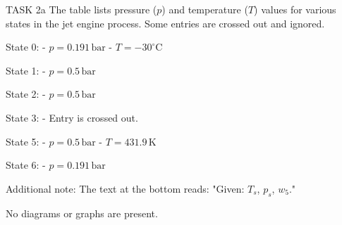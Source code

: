 TASK 2a  
The table lists pressure (\( p \)) and temperature (\( T \)) values for various states in the jet engine process. Some entries are crossed out and ignored.  

State 0:  
- \( p = 0.191 \, \text{bar} \)  
- \( T = -30^\circ\text{C} \)  

State 1:  
- \( p = 0.5 \, \text{bar} \)  

State 2:  
- \( p = 0.5 \, \text{bar} \)  

State 3:  
- Entry is crossed out.  

State 5:  
- \( p = 0.5 \, \text{bar} \)  
- \( T = 431.9 \, \text{K} \)  

State 6:  
- \( p = 0.191 \, \text{bar} \)  

Additional note:  
The text at the bottom reads:  
"Given: \( T_s \), \( p_s \), \( w_5 \)."  

No diagrams or graphs are present.